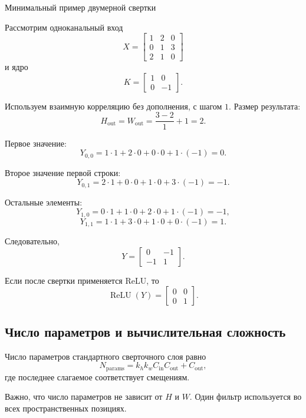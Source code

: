 \documentclass[12pt,a4paper]{article}
\newcommand{\ReLU}{\operatorname{ReLU}}
\numberwithin{equation}{section}
\theoremstyle{definition}
\theoremstyle{remark}
\begin{document}
\begin{examplebox}{Минимальный пример двумерной свертки}

Рассмотрим одноканальный вход
\[
    X=
    \begin{bmatrix}
        1&2&0\\
        0&1&3\\
        2&1&0
    \end{bmatrix}
\]
и ядро
\[
    K=
    \begin{bmatrix}
        1&0\\
        0&-1
    \end{bmatrix}.
\]

Используем взаимную корреляцию без дополнения, с шагом \(1\).
Размер результата:
\[
    H_{\mathrm{out}}=W_{\mathrm{out}}
    =
    \frac{3-2}{1}+1=2.
\]

Первое значение:
\[
    Y_{0,0}
    =
    1\cdot1+2\cdot0+0\cdot0+1\cdot(-1)
    =0.
\]

Второе значение первой строки:
\[
    Y_{0,1}
    =
    2\cdot1+0\cdot0+1\cdot0+3\cdot(-1)
    =-1.
\]

Остальные элементы:
\[
    Y_{1,0}
    =
    0\cdot1+1\cdot0+2\cdot0+1\cdot(-1)
    =-1,
\]
\[
    Y_{1,1}
    =
    1\cdot1+3\cdot0+1\cdot0+0\cdot(-1)
    =1.
\]

Следовательно,
\[
    Y=
    \begin{bmatrix}
        0&-1\\
        -1&1
    \end{bmatrix}.
\]

Если после свертки применяется ReLU, то
\[
    \ReLU(Y)
    =
    \begin{bmatrix}
        0&0\\
        0&1
    \end{bmatrix}.
\]
\end{examplebox}

\subsection{Число параметров и вычислительная сложность}

Число параметров стандартного сверточного слоя равно
\[
    N_{\mathrm{params}}
    =
    k_hk_wC_{\mathrm{in}}C_{\mathrm{out}}
    +
    C_{\mathrm{out}},
\]
где последнее слагаемое соответствует смещениям.

Важно, что число параметров не зависит от \(H\) и \(W\). Один фильтр
используется во всех пространственных позициях.
\end{document}
